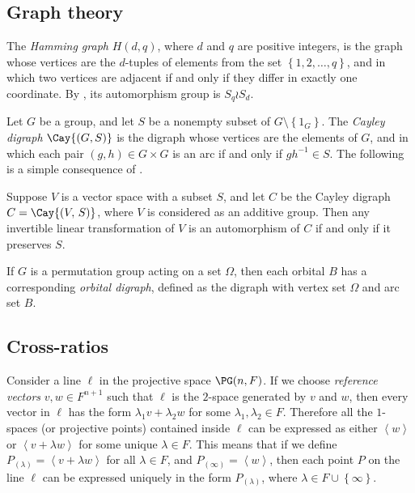 \subsection{Graph theory}

The \emph{Hamming graph} $H{\left(d, q \right)}$, where $d$ and $q$ are positive integers, is the graph whose vertices are the $d$-tuples of elements from the set $\left\{1, 2, \ldots, q \right\}$, and in which two vertices are adjacent if and only if they differ in exactly one coordinate. By \cite[Theorem 9.2.1]{ref:brouwer-distance}, its automorphism group is $S_q \wr S_d$.

Let $G$ be a group, and let $S$ be a nonempty subset of $G \setminus \left\{1_G \right\}$. The \emph{Cayley digraph} $\Cay{\left(G, S \right)}$ is the digraph whose vertices are the elements of $G$, and in which each pair $\left(g, h \right) \in G \times G$ is an arc if and only if $g h^{-1} \in S$. The following is a simple consequence of \cite[Lemma 3.7.3]{ref:godsil-algebraic}.

\begin{lemma} \label{lm:endomorphism-automorphism}
Suppose $V$ is a vector space with a subset $S$, and let $C$ be the Cayley digraph $C = \Cay{\left(V,\, S \right)}$, where $V$ is considered as an additive group. Then any invertible linear transformation of $V$ is an automorphism of $C$ if and only if it preserves $S$.
\end{lemma}

If $G$ is a permutation group acting on a set $\Omega$, then each orbital $B$ has a corresponding \emph{orbital digraph}, defined as the digraph with vertex set $\Omega$ and arc set $B$.

\subsection{Cross-ratios}

Consider a line $\ell$ in the projective space $\PG(n, F)$. If we choose \emph{reference vectors} $v, w \in F^{n+1}$ such that $\ell$ is the $2$-space generated by $v$ and $w$, then every vector in $\ell$ has the form $\lambda_1 v + \lambda_2 w$ for some $\lambda_1, \lambda_2 \in F$. Therefore all the $1$-spaces (or projective points) contained inside $\ell$ can be expressed as either $\left<w \right>$ or $\left<v + \lambda w \right>$ for some unique $\lambda \in F$. This means that if we define $P_{\left(\lambda \right)} = \left<v + \lambda w \right>$ for all $\lambda \in F$, and $P_{\left(\infty \right)} = \left<w \right>$, then each point $P$ on the line $\ell$ can be expressed uniquely in the form $P_{\left(\lambda \right)}$, where $\lambda \in F \cup \left\{\infty \right\}$.

